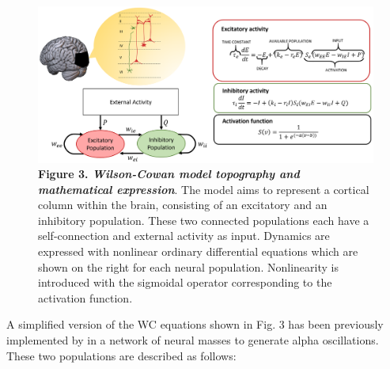 \documentclass[12pt,twoside]{article}
\begin{document}
\begin{figure}[h]
    \centering
    \includegraphics[scale=0.48]{Images/Fig3__WC.png}
    \caption*{\textbf{Figure 3.  \textit{Wilson-Cowan model topography and mathematical expression}}. The model aims to represent a cortical column within the brain, consisting of an excitatory and an inhibitory population. These two connected populations each have a self-connection and external activity as input. Dynamics are expressed with nonlinear ordinary differential equations which are shown on the right for each neural population. Nonlinearity is introduced with the sigmoidal operator corresponding to the activation function.}
    \label{fig:WC_topography}
\end{figure}



A simplified version of the WC equations shown in Fig. 3 has been previously implemented by \citet{abeysuriya2018biophysical} in a network of neural masses to generate alpha oscillations. These two populations are described as follows:
\end{document}
